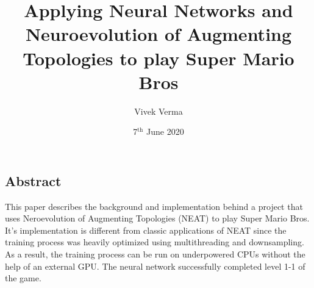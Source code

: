 \documentclass[11pt]{article}
\author{Vivek Verma}
\date{7\(^{\text{th}}\) June 2020}
\title{Applying Neural Networks and Neuroevolution of Augmenting Topologies to play Super Mario Bros}
\begin{document}
\maketitle
\begin{multicols}{2}

\section{Abstract}
\label{sec:orgc4d26a8}
This paper describes the background and implementation behind a project that uses Neroevolution of Augmenting Topologies (NEAT) to play Super Mario Bros. 
It's implementation is different from classic applications of NEAT since the training process was heavily optimized using multithreading and downsampling.
As a result, the training process can be run on underpowered CPUs without the help of an external GPU. The neural network successfully completed level 1-1 of the game.

\end{multicols}
\end{document}

